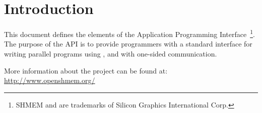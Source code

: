 \section{Introduction}

This document defines the elements of the \openshmem  Application Programming
Interface~\footnote{SHMEM and \openshmem  are trademarks of Silicon Graphics International Corp.}.
The purpose of the \openshmem  \ac{API} is to provide programmers
with a standard interface for writing parallel programs
using \Clang, \Cpp{} and \Fortran{} with one-sided communication.

More information about the \openshmem  project can be found at:\\
\url{http://www.openshmem.org/}
